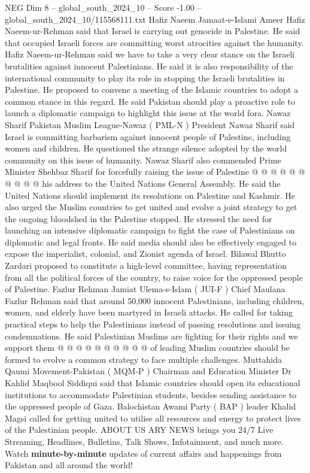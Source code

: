 \begin{textsample}{NEG Dim 8 – global\_south\_2024\_10 – Score -1.00 – global\_south\_2024\_10/115568111.txt}
Hafiz Naeem Jamaat-e-Islami Ameer Hafiz Naeem-ur-Rehman said that Israel is carrying out genocide in Palestine.
He said that occupied Israeli forces are committing worst atrocities against the humanity.
Hafiz Naeem-ur-Rehman said we have to take a very clear stance on the Israeli brutalities against innocent Palestinians.
He said it is also responsibility of the international community to play its role in stopping the Israeli brutalities in Palestine.
He proposed to convene a meeting of the Islamic countries to adopt a common stance in this regard.
He said Pakistan should play a proactive role to launch a diplomatic campaign to highlight this issue at the world fora.
Nawaz Sharif Pakistan Muslim League-Nawaz ( PML-N ) President Nawaz Sharif said Israel is committing barbarism against innocent people of Palestine, including women and children.
He questioned the strange silence adopted by the world community on this issue of humanity.
Nawaz Sharif also commended Prime Minister Shehbaz Sharif for forcefully raising the issue of Palestine @ @ @ @ @ @ @ @ @ @ his address to the United Nations General Assembly.
He said the United Nations should implement its resolutions on Palestine and Kashmir.
He also urged the Muslim countries to get united and evolve a joint strategy to get the ongoing bloodshed in the Palestine stopped.
He stressed the need for launching an intensive diplomatic campaign to fight the case of Palestinians on diplomatic and legal fronts.
He said media should also be effectively engaged to expose the imperialist, colonial, and Zionist agenda of Israel.
Bilawal Bhutto Zardari proposed to constitute a high-level committee, having representation from all the political forces of the country, to raise voice for the oppressed people of Palestine.
Fazlur Rehman Jamiat Ulema-s-Islam ( JUI-F ) Chief Maulana Fazlur Rehman said that around 50,000 innocent Palestinians, including children, women, and elderly have been martyred in Israeli attacks.
He called for taking practical steps to help the Palestinians instead of passing resolutions and issuing condemnations.
He said Palestinian Muslims are fighting for their rights and we support them @ @ @ @ @ @ @ @ @ @ of leading Muslim countries should be formed to evolve a common strategy to face multiple challenges.
Muttahida Qaumi Movement-Pakistan ( MQM-P ) Chairman and Education Minister Dr Kahlid Maqbool Siddiqui said that Islamic countries should open its educational institutions to accommodate Palestinian students, besides sending assistance to the oppressed people of Gaza.
Balochistan Awami Party ( BAP ) leader Khalid Magsi called for getting united to utilise all resources and energy to protect lives of the Palestinian people.
ABOUT US ARY NEWS brings you 24/7 Live Streaming, Headlines, Bulletins, Talk Shows, Infotainment, and much more.
Watch \textbf{minute-by-minute} updates of current affairs and happenings from Pakistan and all around the world!

\end{textsample}
